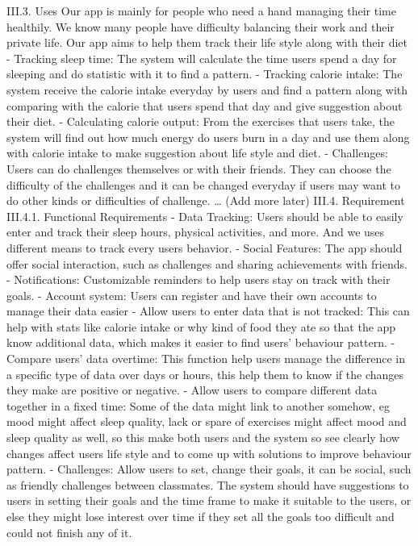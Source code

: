 \documentclass[12pt]{article}
\begin{document}
III.3. Uses
Our app is mainly for people who need a hand managing their time healthily. We know many people have difficulty balancing their work and their private life. Our app aims to help them track their life style along with their diet
-    	Tracking sleep time: The system will calculate the time users spend a day for sleeping and do statistic with it to find a pattern.
- 		Tracking calorie intake: The system receive the calorie intake everyday by users and find a pattern along with comparing with the calorie that users spend that day and give suggestion about their diet.
-   	Calculating calorie output: From the exercises that users take, the system will find out how much energy do users burn in a day and use them along with calorie intake to make suggestion about life style and diet.
- 		Challenges: Users can do challenges themselves or with their friends. They can choose the difficulty of the challenges and it can be changed everyday if users may want to do other kinds or difficulties of challenge.
…
(Add more later)
III.4. Requirement
III.4.1. Functional Requirements
-   	Data Tracking: Users should be able to easily enter and track their sleep hours, physical activities, and more. And we uses different means to track every users behavior.
-  		Social Features: The app should offer social interaction, such as challenges and sharing achievements with friends.
-   	Notifications: Customizable reminders to help users stay on track with their goals.
-   	Account system: Users can register and have their own accounts to manage their data easier
-  		Allow users to enter data that is not tracked: This can help with stats like calorie intake or why kind of food they ate so that the app know additional data, which makes it easier to find users’ behaviour pattern.
-    	Compare users’ data overtime: This function help users manage the difference in a specific type of data over days or hours, this help them to know if the changes they make are positive or negative.
-   	Allow users to compare different data together in a fixed time: Some of the data might link to another somehow, eg mood might affect sleep quality, lack or spare of exercises might affect mood and sleep quality as well, so this make both users and the system so see clearly how changes affect users life style and to come up with solutions to improve behaviour pattern.
-  		Challenges: Allow users to set, change their goals, it can be social, such as friendly challenges between classmates. The system should have suggestions to users in setting their goals and the time frame to make it suitable to the users, or else they might lose interest over time if they set all the goals too difficult and could not finish any of it.
 
\end{document}
